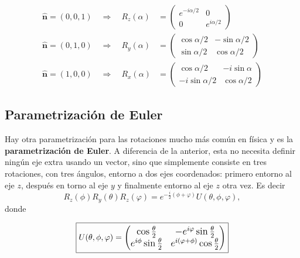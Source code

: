 \documentclass[a4paper,11pt]{book} %
\numberwithin{equation}{chapter}
\def\lp{\left(}
\def\rp{\right)}
\def\rqa{\quad \Rightarrow \quad}
\begin{document}
	\begin{equation} \label{ec_puertas_simples_Rz_Ry_Rx}
	\begin{split}
	\bm{\hat{n}} = (0,0,1) \rqa R_z(\alpha) & = 
	 \lp \begin{matrix}
	 e^{-i \alpha/2} & 0                       \\
	 0               & e^{i \alpha/2} 
	 \end{matrix} \rp    \\
\bm{\hat{n}} = (0,1,0) \rqa R_y(\alpha) & =
	 \lp \begin{matrix}
	 \cos \alpha/2     &  -\sin \alpha/2       \\
	 \sin \alpha/2     &  \cos \alpha/2 
	 \end{matrix} \rp   \\
\bm{\hat{n}} = (1,0,0) \rqa R_x(\alpha) & = 
	 \lp \begin{matrix}
	 \cos \alpha/2       &   -i \sin \alpha     \\
	 -i \sin \alpha/2    &   \cos \alpha/2 
	 \end{matrix} \rp 
	\end{split}
	\end{equation}
   
        \subsection{Parametrización de Euler} \label{sec_subsub_puertas_euler}
        
Hay otra parametrización para las rotaciones mucho más común en física y es la \textbf{parametrización de Euler}. A diferencia de la anterior, esta no necesita definir ningún eje extra usando un vector, sino que simplemente consiste en tres rotaciones, con tres ángulos, entorno a dos ejes coordenados: primero entorno al eje $z$, después en torno al eje $y$ y finalmente entorno al eje $z$ otra vez. Es decir
	\begin{equation} \label{ec_puertas_simples_rotacion_1}
	R_z(\phi) R_y (\theta) R_z(\varphi) = e^{- \frac{i}{2} (\phi + \varphi)} U (\theta, \phi, \varphi),
	\end{equation}
donde 
	
	\begin{equation} \label{ec_puertas_simples_rotacion_U}
	\boxed{U (\theta, \phi, \varphi) = \large{ \lp \begin{matrix}
	\cos \frac{\theta}{2}                &  - e^{i\varphi} \sin \frac{\theta}{2} \\
	e^{i \phi} \sin \frac{\theta}{2}     &  e^{i (\varphi + \phi)} \cos \frac{\theta}{2}
	\end{matrix} \rp}}
	\end{equation}
\end{document}

